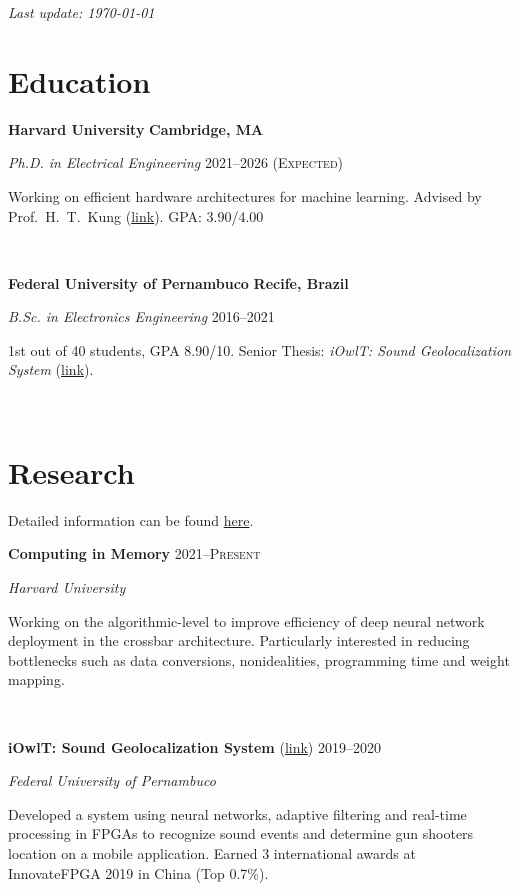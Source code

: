 \documentclass[letterpaper,10pt]{article}
\newcommand{\entry}[4]{

\begin{minipage}[t]{.15\textwidth}
\end{minipage}
\hfill\vline\hfill 
\begin{minipage}[t]{0.95\textwidth}
#2 \hfill \textsc{#1}

\textit{#3}

\footnotesize{#4}
\end{minipage}\\\vspace{.25cm}}
\newcommand{\we}[5]{

\begin{minipage}[t]{.15\textwidth}
\end{minipage}
\hfill\vline\hfill 
\begin{minipage}[t]{0.95\textwidth}
#2 \hfill \textbf{#5}

\textit{#3} \hfill \textsc{#1}

\footnotesize{#4}
\end{minipage}\\\vspace{.25cm}}
\newcommand{\harv}{Harvard University}
\newcommand{\ufpe}{Federal University of Pernambuco}
\begin{document}
\par{\par}
\par{\par}
\par{\par}
\hfill \textit{Last update: \today}
\vspace{-.25cm}

\section{Education}
\vspace*{.1cm}
\we{2021--2026 (Expected)}{\textbf{\harv}}{Ph.D. in Electrical Engineering}{Working on efficient hardware architectures for machine learning. Advised by Prof.\ H.\ T.\ Kung (\href{https://www.eecs.harvard.edu/htk/}{link}). GPA: 3.90/4.00}{Cambridge, MA}

\we{2016--2021}{\textbf{\ufpe}}{B.Sc. in Electronics Engineering}{
	1st out of 40 students, GPA 8.90/10. Senior Thesis: \textit{iOwlT: Sound Geolocalization System} (\href{https://www.matheussfarias.com/assets/files/SeniorThesis.pdf}{link}).
	}{Recife, Brazil}

\vspace*{-.25cm}
\section{Research}

Detailed information can be found \href{https://www.matheussfarias.com/}{here}.

\vspace{.1cm}

\entry{2021--Present}{\textbf{Computing in Memory}}{\harv}{
	Working on the algorithmic-level to improve efficiency of deep neural network deployment in the crossbar architecture. Particularly interested in reducing bottlenecks such as data conversions, nonidealities, programming time and weight mapping.
}

\entry{2019--2020}{\textbf{iOwlT: Sound Geolocalization System} (\href{https://www.matheussfarias.com/iowlt.html}{link})}{\ufpe}{
	Developed a system using neural networks, adaptive filtering and real-time processing in FPGAs to recognize sound events and determine gun shooters location on a mobile application. Earned 3 international awards at InnovateFPGA 2019 in China (Top 0.7\%).
}
\end{document}
